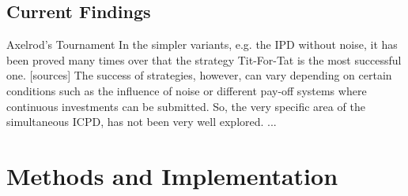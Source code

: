 \documentclass{article}
\begin{document}
%
%
%
%

\subsection{Current Findings}

Axelrod's Tournament
In the simpler variants, e.g. the IPD without noise, it has been proved many times over that the strategy Tit-For-Tat is the most successful one. [sources]
The success of strategies, however, can vary depending on certain conditions such as the influence of noise or different pay-off systems where continuous investments can be submitted.
So, the very specific area of the simultaneous ICPD, has not been very well explored.
...

\section{Methods and Implementation}
\end{document}

